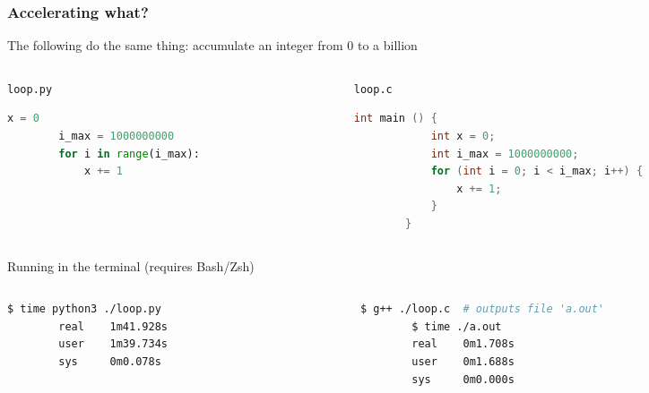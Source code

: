 \documentclass[10pt, aspectratio=1610]{beamer}
\begin{document}
\begin{frame}[fragile]
  \frametitle{Accelerating what?}

  The following do the same thing: accumulate an integer from 0 to a billion

  \begin{columns}[T]
    \begin{column}{0.35\textwidth}
      \texttt{loop.py}
      \begin{lstlisting}[language=python]
        x = 0
        i_max = 1000000000
        for i in range(i_max):
            x += 1
      \end{lstlisting}
    \end{column}
    \begin{column}{0.45\textwidth}
      \texttt{loop.c}
      \begin{lstlisting}[language=c]
        int main () {
            int x = 0;
            int i_max = 1000000000;
            for (int i = 0; i < i_max; i++) {
                x += 1;
            }
        }
      \end{lstlisting}
    \end{column}
  \end{columns}

  Running in the terminal (requires Bash/Zsh)
  \begin{columns}[T]
    \begin{column}{0.35\textwidth}
      \begin{lstlisting}[language=bash]
        $ time python3 ./loop.py
        real    1m41.928s
        user    1m39.734s
        sys     0m0.078s
      \end{lstlisting}
    \end{column}
    \begin{column}{0.45\textwidth}
      \begin{lstlisting}[language=bash]
        $ g++ ./loop.c  # outputs file 'a.out'
        $ time ./a.out
        real    0m1.708s
        user    0m1.688s
        sys     0m0.000s
      \end{lstlisting}
    \end{column}
  \end{columns}

\end{frame}





\end{document}

